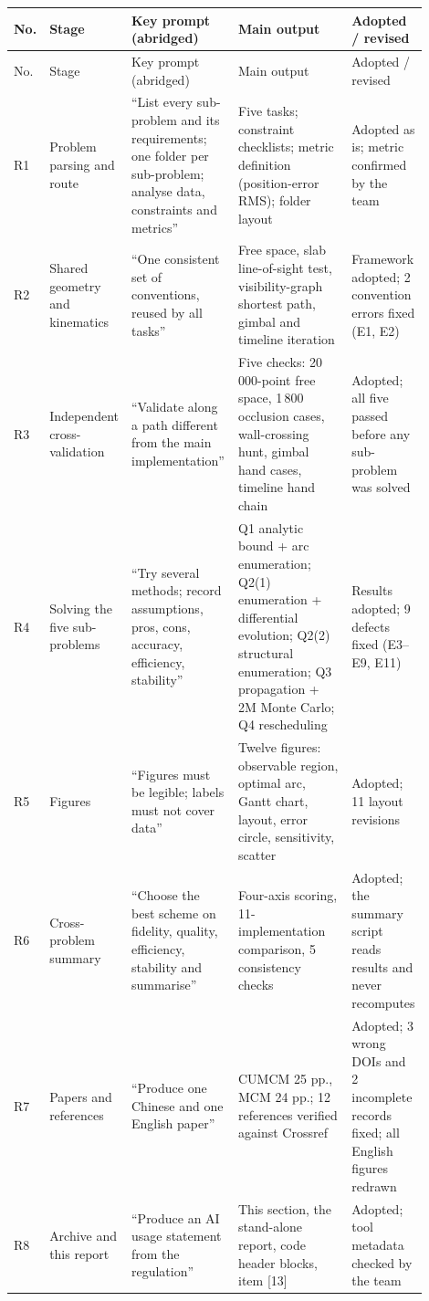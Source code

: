 \documentclass[12pt]{article}
\begin{document}
{\begin{longtable}{@{}>{\raggedright\arraybackslash}p{0.04\linewidth}
                 >{\raggedright\arraybackslash}p{0.125\linewidth}
                 >{\raggedright\arraybackslash}p{0.26\linewidth}
                 >{\raggedright\arraybackslash}p{0.30\linewidth}
                 >{\raggedright\arraybackslash}p{0.17\linewidth}@{}}
\toprule
No. & Stage & Key prompt (abridged) & Main output & Adopted / revised \\
\midrule
\endfirsthead
\toprule
No. & Stage & Key prompt (abridged) & Main output & Adopted / revised \\
\midrule
\endhead
\bottomrule
\endlastfoot
R1 & Problem parsing and route & ``List every sub-problem and its requirements; one folder per sub-problem; analyse data, constraints and metrics'' & Five tasks; constraint checklists; metric definition (position-error RMS); folder layout & Adopted as is; metric confirmed by the team \\
R2 & Shared geometry and kinematics & ``One consistent set of conventions, reused by all tasks'' & Free space, slab line-of-sight test, visibility-graph shortest path, gimbal and timeline iteration & Framework adopted; 2 convention errors fixed (E1, E2) \\
R3 & Independent cross-validation & ``Validate along a path different from the main implementation'' & Five checks: 20\,000-point free space, 1\,800 occlusion cases, wall-crossing hunt, gimbal hand cases, timeline hand chain & Adopted; all five passed before any sub-problem was solved \\
R4 & Solving the five sub-problems & ``Try several methods; record assumptions, pros, cons, accuracy, efficiency, stability'' & Q1 analytic bound + arc enumeration; Q2(1) enumeration + differential evolution; Q2(2) structural enumeration; Q3 propagation + 2M Monte Carlo; Q4 rescheduling & Results adopted; 9 defects fixed (E3--E9, E11) \\
R5 & Figures & ``Figures must be legible; labels must not cover data'' & Twelve figures: observable region, optimal arc, Gantt chart, layout, error circle, sensitivity, scatter & Adopted; 11 layout revisions \\
R6 & Cross-problem summary & ``Choose the best scheme on fidelity, quality, efficiency, stability and summarise'' & Four-axis scoring, 11-implementation comparison, 5 consistency checks & Adopted; the summary script reads results and never recomputes \\
R7 & Papers and references & ``Produce one Chinese and one English paper'' & CUMCM 25 pp., MCM 24 pp.; 12 references verified against Crossref & Adopted; 3 wrong DOIs and 2 incomplete records fixed; all English figures redrawn \\
R8 & Archive and this report & ``Produce an AI usage statement from the regulation'' & This section, the stand-alone report, code header blocks, item [13] & Adopted; tool metadata checked by the team \\
\end{longtable}

}
\end{document}
